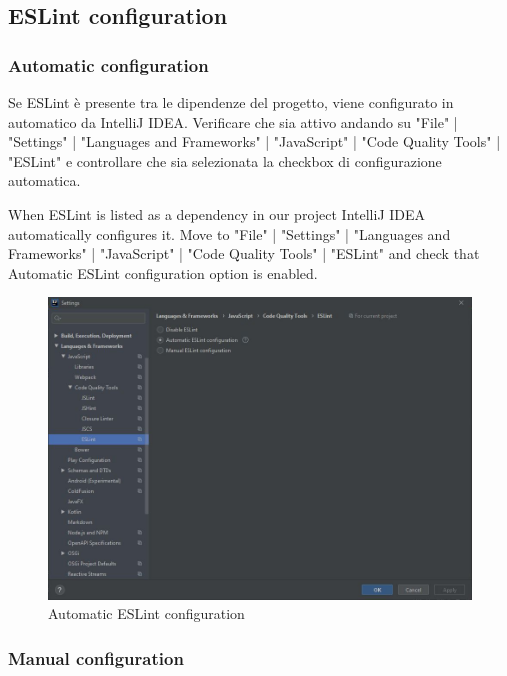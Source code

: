 	\subsection{ESLint configuration}
		\subsubsection{Automatic configuration}
	Se ESLint è presente tra le dipendenze del progetto, viene configurato in automatico da IntelliJ IDEA. Verificare che sia attivo andando su "File" | "Settings" | "Languages and Frameworks" | "JavaScript" | "Code Quality Tools" | "ESLint" e controllare che sia selezionata la checkbox di configurazione automatica. 
	
When ESLint is listed as a dependency in our project IntelliJ IDEA automatically configures it. Move to "File" | "Settings" | "Languages and Frameworks" | "JavaScript" | "Code Quality Tools" | "ESLint" and check that Automatic ESLint configuration option is enabled. 


\begin{figure}[H]
		\centering
		\includegraphics[scale=0.60]{../Developer_manual/img/automatic_eslint_configuration.JPG}
		\caption{Automatic ESLint configuration}
	\end{figure}	

		\subsubsection{Manual configuration}
	
